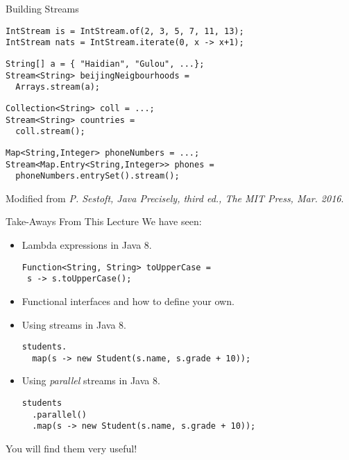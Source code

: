 \documentclass{beamer}
\begin{document}
\begin{frame}[fragile]{Building Streams}
\begin{lstlisting}
IntStream is = IntStream.of(2, 3, 5, 7, 11, 13);
IntStream nats = IntStream.iterate(0, x -> x+1);
\end{lstlisting}
\pause{} \begin{lstlisting}
String[] a = { "Haidian", "Gulou", ...};
Stream<String> beijingNeigbourhoods =
  Arrays.stream(a);
\end{lstlisting}
\pause{} \begin{lstlisting}
Collection<String> coll = ...;
Stream<String> countries =
  coll.stream();
\end{lstlisting}
\pause{} \begin{lstlisting}
Map<String,Integer> phoneNumbers = ...;
Stream<Map.Entry<String,Integer>> phones =
  phoneNumbers.entrySet().stream();
\end{lstlisting}

\footnotesize{Modified from \emph{P. Sestoft, Java Precisely, third ed., The MIT Press, Mar. 2016}.}
\end{frame}

\begin{frame}[fragile]{Take-Aways From This Lecture}
  We have seen:

  \begin{itemize}
  \pause{} \item Lambda expressions in Java 8.
    \begin{lstlisting}[basicstyle=\footnotesize\ttfamily]
Function<String, String> toUpperCase =
 s -> s.toUpperCase();
    \end{lstlisting}
  \pause{} \item Functional interfaces and how to define your own.
  \pause{} \item Using streams in Java 8.
    \begin{lstlisting}[basicstyle=\footnotesize\ttfamily]
students.
  map(s -> new Student(s.name, s.grade + 10));
    \end{lstlisting}
  \pause{} \item Using \emph{parallel} streams in Java 8.
    \begin{lstlisting}[basicstyle=\footnotesize\ttfamily]
students
  .parallel()
  .map(s -> new Student(s.name, s.grade + 10));
    \end{lstlisting}
  \end{itemize}
  \pause{}
  You will find them very useful!
\end{frame}
\end{document}
